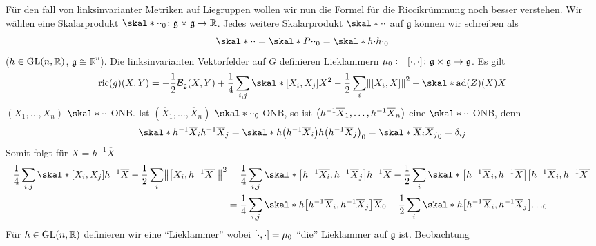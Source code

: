 Für den fall von linksinvarianter Metriken auf Liegruppen wollen wir nun die Formel für die Riccikrümmung noch besser verstehen.
Wir wählen eine Skalarprodukt $\skal*{\cdot }{\cdot }_0 \colon \mathfrak{g} \times \mathfrak{g} \to \mathbb{R}$.
Jedes weitere Skalarprodukt $\skal*{\cdot }{\cdot}$ auf $\mathfrak{g}$ können wir schreiben als
\[
	\skal*{\cdot }{\cdot } = \skal*{P \cdot }{\cdot }_0 = \skal*{h \cdot }{h \cdot }_0
\]
($h \in \GL(n,\mathbb{R})$, $\mathfrak{g} \cong \mathbb{R}^n$).
Die linksinvarianten Vektorfelder auf $G$ definieren Lieklammern $\mu_0 \coloneqq \benbrace*{\cdot,\cdot} \colon \mathfrak{g} \times \mathfrak{g} \to \mathfrak{g}$.
Es gilt 
\[
	\ric(g) (X,Y) = - \frac{1}{2} \mathcal{B}_\mathfrak{g}(X,Y) + \frac{1}{4} \sum_{i,j} \skal*{\benbrace*{X_i,X_j}}{X}^2 - \frac{1}{2} \sum_{i} \norm*{\benbrace*{X_i,X}}^2 - \skal*{\ad(Z)(X)}{X}
\]
$(X_1, \ldots ,X_n)$ $\skal*{\cdot }{\cdot }$-ONB.
Ist $(\overline{X}_1, \ldots ,\overline{X}_n)$ $\skal*{\cdot }{\cdot }_0$-ONB, so ist $\enbrace*{h^{-1} \overline{X}_1, \ldots , h^{-1} \overline{X}_n}$ eine $\skal*{\cdot }{\cdot }$-ONB, denn 
\[
	\skal*{h^{-1} \overline{X}_i}{h^{-1}\overline{X}_j} = \skal*{h \enbrace*{h^{-1} \overline{X}_i}}{h \enbrace*{h^{-1} \overline{X}_j}}_0 = \skal*{\overline{X}_i}{\overline{X}_j}_0 = \delta_{ij}
\]
Somit folgt für $X= h^{-1} \overline{X}$
\begin{align}
	\frac{1}{4}  \sum_{i,j} \skal*{\benbrace*{X_i,X_j}}{h^{-1} \overline{X}} - \frac{1}{2} \sum_i \norm*{\benbrace*{X_i, h^{-1} \overline{X}}}^2 &= \frac{1}{4} \sum_{i,j} \skal*{ \benbrace*{h^{-1} \overline{X_i}, h^{-1} \overline{X}_j}}{h^{-1} \overline{X}} - \frac{1}{2} \sum_i \skal*{\benbrace*{h^{-1} \overline{X}_i, h^{-1} \overline{X}}}{\benbrace*{h^{-1} \overline{X}_i, h^{-1} \overline{X}}}   \\
	&= \frac{1}{4} \sum_{i,j} \skal*{ h \benbrace*{h^{-1} \overline{X}_i, h^{-1} \overline{X}_j}}{\overline{X}}_0 - \frac{1}{2} \sum_i \skal*{h \benbrace*{h^{-1} \overline{X}_i, h^{-1} \overline{X}_j}}{\ldots }_0 
\end{align}
Für $h \in \GL(n,\mathbb{R})$ definieren wir eine \enquote{Lieklammer}
wobei $\benbrace*{\cdot ,\cdot }= \mu_0$ \enquote{die} Lieklammer auf $\mathfrak{g}$ ist.
Beobachtung
